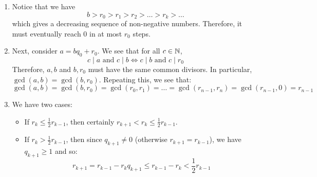 \documentclass{article}
\begin{document}
\begin{pf}[source=Primary Source Material]
\begin{enumerate}
    \item Notice that we have
        \begin{equation*}
            b > r_{0} > r_{1} > r_{2} > \dots > r_{k} > \dots
        \end{equation*}
        which gives a decreasing sequence of non-negative numbers.
        Therefore, it must eventually reach $ 0 $ in at most $ r_{0} $ steps.

    \item Next, consider $ a = bq_{0} + r_{0} $. We see that for all $ c \in \mathbb{N} $,
        \begin{equation*}
            c \mid a \textrm{ and } c \mid b \iff c \mid b \textrm{ and } c \mid r_{0}
        \end{equation*}
        Therefore, $ a, b $ and $ b, r_{0} $ must have the same common divisors.
        In particular, $ \gcd(a, b) = \gcd(b, r_{0}) $.
        Repeating this, we see that:
        \begin{equation*}
            \gcd(a, b) = \gcd(b, r_{0}) = \gcd(r_{0}, r_{1}) = \dots = \gcd(r_{n-1}, r_{n}) = \gcd(r_{n-1} , 0) = r_{n-1}
        \end{equation*}

    \item We have two cases:
        \begin{itemize}
            \item If $ r_{k} \leq \frac 1 2 r_{k-1} $, then certainly $ r_{k+1} < r_{k} \leq \frac 1 2 r_{k-1} $.
            \item If $ r_{k} > \frac 1 2 r_{k-1} $, then since $ q_{k+1} \neq 0 $ (otherwise $ r_{k+1} = r_{k-1} $), we have $ q_{k+1} \geq 1 $ and so:
                \begin{equation*}
                    r_{k+1} = r_{k-1} - r_{k}q_{k+1} \leq r_{k-1} - r_{k} < \frac 1 2 r_{k-1}
                \end{equation*}
        \end{itemize}
\end{enumerate}
\end{pf}
\end{document}
